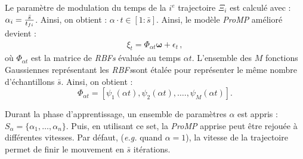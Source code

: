 \documentclass[utf8]{frontiersSCNS} %
\newcommand{\todo}[1]{\textcolor{red}{\textbf{/*#1*/}}}
\begin{document}
Le paramètre de modulation du temps de la $i^e$ trajectoire $\Xi_i$ est calculé avec : $ \alpha_i = {\bar{s} \over t_{fi}}$. Ainsi, on obtient : $\alpha \cdot t \in [1:\bar{s}]$. Ainsi, le modèle \textit{ProMP} amélioré devient :
\begin{eqnarray}
\xi_t = \Phi_{\alpha t} \boldsymbol{\omega} + \epsilon_t \, ,
\end{eqnarray}
où $\Phi_{\alpha t}$ est la matrice de \textit{RBFs} évaluée au temps $\alpha t$. L'ensemble des $M$ fonctions Gaussiennes représentant les \textit{RBFs}sont étalée pour représenter le même nombre d'échantillons $\bar{s}$. Ainsi, on obtient :
$$ \Phi_{\alpha t}=[\psi_{1}(\alpha t), \psi_{2}(\alpha t), \ldots., \psi_{M}(\alpha t)].$$

%
%
%
%

Durant la phase d'apprentissage, un ensemble de paramètres $\alpha$ est appris : $S_{\alpha} = \{\alpha_{1},\ldots,\alpha_{n}\}$.
Puis, en utilisant ce set, la \textit{ProMP} apprise peut être rejouée à différentes vitesses. Par défaut, (\textit{e.g.} quand $\alpha=1$), la vitesse de la trajectoire permet de finir le mouvement en $\bar{s}$ itérations.
\end{document}
